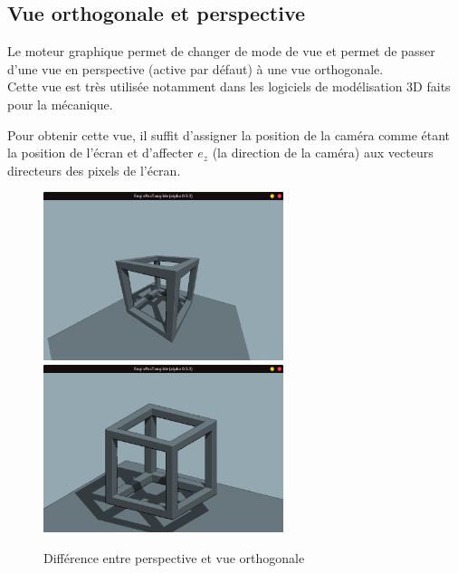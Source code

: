 \subsection{Vue orthogonale et perspective}
Le moteur graphique permet de changer de mode de vue et permet de passer d'une vue en perspective (active par défaut) à une vue orthogonale.\\
Cette vue est très utilisée notamment dans les logiciels de modélisation 3D faits pour la mécanique.\\
\par
Pour obtenir cette vue, il suffit d'assigner la position de la caméra comme étant la position de l'écran et d'affecter $e_z$ (la direction de la caméra) aux vecteurs directeurs des pixels de l'écran.
\begin{figure}[h]
    \centering
    \includegraphics[width=7cm]{images/screens/orthoff.png}
    \includegraphics[width=7cm]{images/screens/orthon.png}
    \caption{Différence entre perspective et vue orthogonale}
    \label{fig:orthoview}
\end{figure}